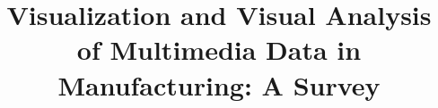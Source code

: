 \documentclass[a4paper,fleqn]{cas-dc}
\begin{document}
	\let\WriteBookmarks\relax
	\def\floatpagepagefraction{1}
	\def\textpagefraction{.001}
	
	\title [mode = title]{Visualization and Visual Analysis of Multimedia Data in Manufacturing: A Survey}                      
	

	
	
	

	

	
\end{document}
